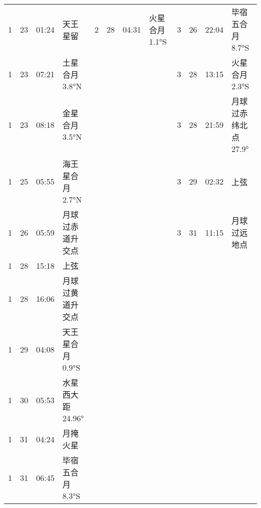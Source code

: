 \begin{tabular}{llll|llll|llll}
1 & 23 & 01:24 & 天王星留 & 2 & 28 & 04:31 & 火星合月 1.1°S & 3 & 26 & 22:04 & 毕宿五合月 8.7°S \tabularnewline
1 & 23 & 07:21 & 土星合月 3.8°N &  &  &  &  & 3 & 28 & 13:15 & 火星合月 2.3°S \tabularnewline
1 & 23 & 08:18 & 金星合月 3.5°N &  &  &  &  & 3 & 28 & 21:59 & 月球过赤纬北点 27.9° \tabularnewline
1 & 25 & 05:55 & 海王星合月 2.7°N &  &  &  &  & 3 & 29 & 02:32 & 上弦 \tabularnewline
1 & 26 & 05:59 & 月球过赤道升交点 &  &  &  &  & 3 & 31 & 11:15 & 月球过远地点 \tabularnewline
1 & 28 & 15:18 & 上弦 &  &  &  &  &  &  &  &  \tabularnewline
1 & 28 & 16:06 & 月球过黄道升交点 &  &  &  &  &  &  &  &  \tabularnewline
1 & 29 & 04:08 & 天王星合月 0.9°S &  &  &  &  &  &  &  &  \tabularnewline
1 & 30 & 05:53 & 水星西大距 24.96° &  &  &  &  &  &  &  &  \tabularnewline
1 & 31 & 04:24 & 月掩火星 &  &  &  &  &  &  &  &  \tabularnewline
1 & 31 & 06:45 & 毕宿五合月 8.3°S &  &  &  &  &  &  &  &  \tabularnewline
\hline \end{tabular}

